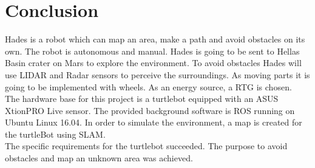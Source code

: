 \chapter{Conclusion}\label{ch:conclusion}


Hades is a robot which can map an area, make a path and avoid obstacles on its own. The robot is autonomous and manual. Hades is going to be sent to Hellas Basin crater on Mars to explore the environment. To avoid obstacles Hades will use LIDAR and Radar sensors to perceive the surroundings. As moving parts it is going to be implemented with wheels. As an energy source, a RTG is chosen.\\ 
The hardware base for this project is a turtlebot equipped with an ASUS XtionPRO Live sensor. The provided background software is ROS running on Ubuntu Linux 16.04. In order to simulate the environment, a map is created for the turtleBot using SLAM.\\
The specific requirements for the turtlebot succeeded. The purpose to avoid obstacles and map an unknown area was achieved.
